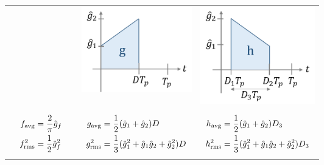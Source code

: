 \documentclass[10pt,landscape]{scrartcl}
\begin{document}
\begin{multicols}{2}
\begin{center}
\begin{tabular}{p{0.2\linewidth} p{0.2\linewidth} p{0.2\linewidth} }
  &
  \includegraphics[width=1.0\linewidth]{img/rms/signal_g.png}%
  &
  \includegraphics[width=1.0\linewidth]{img/rms/signal_h.png}%
  \\
  {\begin{align*}
    f_{\textup{avg}}   &= \frac{2}{\pi}\hat{g}_f \\
    f_{\textup{rms}}^2 &= \frac{1}{2}\hat{g}_f^2
  \end{align*}}
  &
  {\begin{align*}
    g_{\textup{avg}}   &= \frac{1}{2}(\hat{g}_1+\hat{g}_2) D \\
    g_{\textup{rms}}^2 &= \frac{1}{3}(\hat{g}_1^2 + \hat{g}_1\hat{g}_2+\hat{g}_2^2) D
  \end{align*}}
  &
  {\begin{align*}
    h_{\textup{avg}}   &= \frac{1}{2}(\hat{g}_1+\hat{g}_2) D_3 \\
    h_{\textup{rms}}^2 &= \frac{1}{3}(\hat{g}_1^2 + \hat{g}_1\hat{g}_2+\hat{g}_2^2) D_3
  \end{align*}}
\end{tabular}
\end{center}


\end{multicols}
\end{document}
